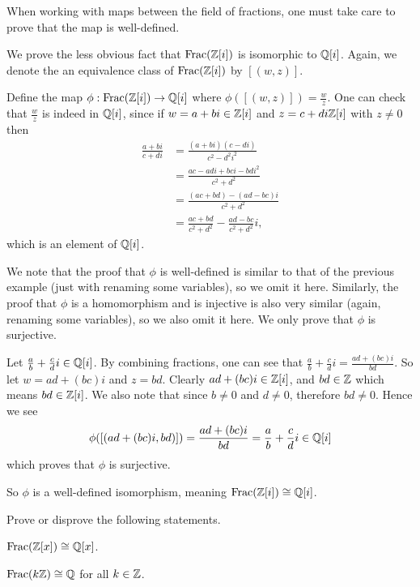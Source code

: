 \begin{remark}
    When working with maps between the field of fractions, one must take care to prove that the map is well-defined.
\end{remark}

\begin{example}\label{example-field-of-fractions-of-gaussian-integers-isomorphic-to-quadratic-integers-of-i}
    We prove the less obvious fact that $\mathrm{Frac}(\mathbb{Z}[i])$ is isomorphic to $\mathbb{Q}[i]$. Again, we denote the an equivalence class of $\mathrm{Frac}(\mathbb{Z}[i])$ by $[(w, z)]$.

    Define the map $\phi: \mathrm{Frac}(\mathbb{Z}[i]) \to \mathbb{Q}[i]$ where $\phi([(w, z)]) = \frac wz$. One can check that $\frac wz$ is indeed in $\mathbb{Q}[i]$, since if $w = a+bi\in\mathbb{Z}[i]$ and $z = c+di\mathbb{Z}[i]$ with $z \neq 0$ then
    \begin{align*}
        \frac{a+bi}{c+di} &= \frac{(a+bi)(c-di)}{c^2 - d^2i^2}\\
        &= \frac{ac-adi+bci-bdi^2}{c^2+d^2}\\
        &= \frac{(ac+bd) - (ad-bc)i}{c^2+d^2}\\
        &= \frac{ac+bd}{c^2+d^2} - \frac{ad-bc}{c^2+d^2}i,
    \end{align*}
    which is an element of $\mathbb{Q}[i]$.

    We note that the proof that $\phi$ is well-defined is similar to that of the previous example (just with renaming some variables), so we omit it here. Similarly, the proof that $\phi$ is a homomorphism and is injective is also very similar (again, renaming some variables), so we also omit it here. We only prove that $\phi$ is surjective.

    Let $\frac ab + \frac cd i \in \mathbb{Q}[i]$. By combining fractions, one can see that $\frac ab + \frac cd i = \frac{ad+(bc)i}{bd}$. So let $w = ad + (bc)i$ and $z = bd$. Clearly $ad + (bc)i \in \mathbb{Z}[i]$, and $bd \in \mathbb{Z}$ which means $bd \in \mathbb{Z}[i]$. We also note that since $b\neq 0$ and $d \neq 0$, therefore $bd \neq 0$. Hence we see
    \[
        \phi([(ad+(bc)i, bd)]) = \frac{ad+(bc)i}{bd} = \frac ab + \frac cd i \in \mathbb{Q}[i]
    \]
    which proves that $\phi$ is surjective.

    So $\phi$ is a well-defined isomorphism, meaning $\mathrm{Frac}(\mathbb{Z}[i]) \cong \mathbb{Q}[i]$.
\end{example}

\begin{exercise}
    Prove or disprove the following statements.
    \begin{partquestions}{\alph*}
        \item $\mathrm{Frac}(\mathbb{Z}[x]) \cong \mathbb{Q}[x]$.
        \item $\mathrm{Frac}(k\mathbb{Z}) \cong \mathbb{Q}$ for all $k \in \mathbb{Z}$.
    \end{partquestions}
\end{exercise}


